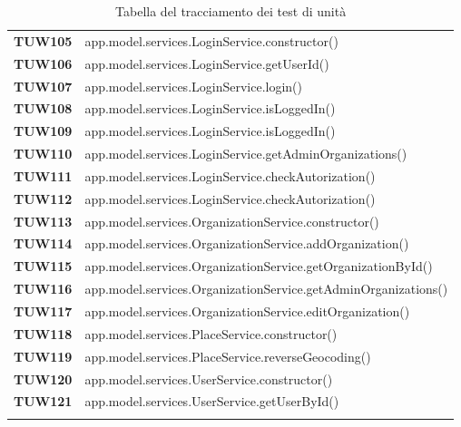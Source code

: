 \documentclass[../../piano-di-qualifica.tex]{subfiles}
\begin{document}
\begin{longtable}[H]{>{\centering\bfseries}m{3cm} >{}m{13cm}}
TUW105             & app.model.services.LoginService.constructor\@()\\ 

TUW106             & app.model.services.LoginService.getUserId\@()\\ 
 
TUW107             & app.model.services.LoginService.login\@()\\ 

TUW108             & app.model.services.LoginService.isLoggedIn\@()\\ 

TUW109             & app.model.services.LoginService.isLoggedIn\@()\\ 

TUW110            & app.model.services.LoginService.getAdminOrganizations\@()\\ 

TUW111             & app.model.services.LoginService.checkAutorization\@()\\ 

TUW112             & app.model.services.LoginService.checkAutorization\@()\\ 


TUW113             & app.model.services.OrganizationService.constructor\@()\\ 

TUW114             & app.model.services.OrganizationService.addOrganization\@()\\ 

 
TUW115             & app.model.services.OrganizationService.getOrganizationById\@()\\ 

TUW116             & app.model.services.OrganizationService.getAdminOrganizations\@()\\ 

TUW117            & app.model.services.OrganizationService.editOrganization\@()\\ 



TUW118             & app.model.services.PlaceService.constructor\@()\\ 

TUW119             & app.model.services.PlaceService.reverseGeocoding\@()\\ 
 

TUW120             & app.model.services.UserService.constructor\@()\\ 

TUW121             & app.model.services.UserService.getUserById\@()\\ 



  \rowcolor{white}
  \caption{Tabella del tracciamento dei test di unità}%
  \label{tab:test_di_unità}
\end{longtable}


\end{document}
